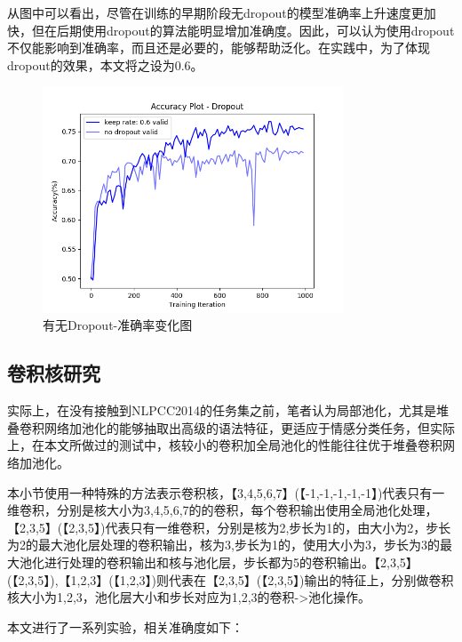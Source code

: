 从图中可以看出，尽管在训练的早期阶段无dropout的模型准确率上升速度更加快，但在后期使用dropout的算法能明显增加准确度。因此，可以认为使用dropout不仅能影响到准确率，而且还是必要的，能够帮助泛化。在实践中，为了体现dropout的效果，本文将之设为0.6。
\begin{center}
\begin{figure}[!hdp]
\includegraphics[width=0.8\textwidth]{graphic/dropout.png}
\caption{有无Dropout-准确率变化图 \label{fdropout}}
\end{figure}
\end{center}
\subsection{卷积核研究}
实际上，在没有接触到NLPCC2014的任务集之前，笔者认为局部池化，尤其是堆叠卷积网络加池化的能够抽取出高级的语法特征，更适应于情感分类任务，但实际上，在本文所做过的测试中，核较小的卷积加全局池化的性能往往优于堆叠卷积网络加池化。


本小节使用一种特殊的方法表示卷积核，【3,4,5,6,7】(【-1,-1,-1,-1,-1】)代表只有一维卷积，分别是核大小为3,4,5,6,7的的卷积，每个卷积输出使用全局池化处理，【2,3,5】(【2,3,5】)代表只有一维卷积，分别是核为2,步长为1的，由大小为2，步长为2的最大池化层处理的卷积输出，核为3,步长为1的，使用大小为3，步长为3的最大池化进行处理的卷积输出和核与池化层，步长都为5的卷积输出。【2,3,5】(【2,3,5】),【1,2,3】(【1,2,3】)则代表在【2,3,5】(【2,3,5】)输出的特征上，分别做卷积核大小为1,2,3，池化层大小和步长对应为1,2,3的卷积->池化操作。


本文进行了一系列实验，相关准确度如下：


